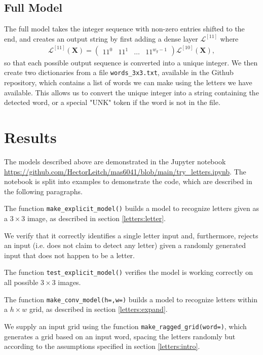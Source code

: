 \documentclass{somasmsc}
\begin{document}
\subsection{Full Model}\label{letters:full}

The full model takes the integer sequence with non-zero entries shifted to the end, and creates an output string by first adding a dense layer $\mathcal{L}^{\left[11\right]}$ where
\begin{align*}
    \mathcal{L}^{\left[11\right]}\left(\mathbf{X}\right) =
    \begin{pmatrix}
        11^0 & 11^1 & \dots & 11^{w_g - 1}
    \end{pmatrix}
    \mathcal{L}^{\left[10\right]}\left(\mathbf{X}\right),
\end{align*}
so that each possible output sequence is converted into a unique integer. We then create two dictionaries from a file \verb|words_3x3.txt|, available in the Github repository, which contains a list of words we can make using the letters we have available. This allows us to convert the unique integer into a string containing the detected word, or a special "UNK" token if the word is not in the file.

\section{Results}

The models described above are demonstrated in the Jupyter notebook \url{https://github.com/HectorLeitch/mas6041/blob/main/try_letters.ipynb}. The notebook is split into examples to demonstrate the code, which are described in the following paragraphs.

\begin{exa}
The function \verb|make_explicit_model()| builds a model to recognize letters given as a $3 \times 3$ image, as described in section \ref{letters:letter}.

We verify that it correctly identifies a single letter input and, furthermore, rejects an input (i.e. does not claim to detect any letter) given a randomly generated input that does not happen to be a letter.

The function \verb|test_explicit_model()| verifies the model is working correctly on all possible $3 \times 3$ images.
\end{exa}

\begin{exa}
The function \verb|make_conv_model(h=,w=)| builds a model to recognize letters within a $h \times w$ grid, as described in section \ref{letters:expand}.

We supply an input grid using the function \verb|make_ragged_grid(word=)|, which generates a grid based on an input word, spacing the letters randomly but according to the assumptions specified in section \ref{letters:intro}.
\end{exa}
\end{document}
